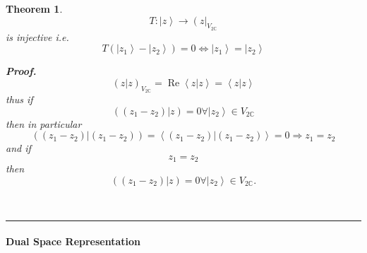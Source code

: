 \documentclass[aps,preprint]{revtex4}%
\newtheorem{theorem}{Theorem}
\newenvironment{proof}[1][Proof]{\noindent\textbf{#1.} }{\ \rule{0.5em}{0.5em}}
\begin{document}
\begin{theorem}%
\begin{equation}
T:\left\vert z\right\rangle \rightarrow\left(  z\right\vert _{V_{2\mathbb{C}}}%
\end{equation}
is injective i.e.
\begin{equation}
T\left(  \left\vert z_{1}\right\rangle -\left\vert z_{2}\right\rangle \right)
=0\Leftrightarrow\left\vert z_{1}\right\rangle =\left\vert z_{2}\right\rangle
\end{equation}


\begin{proof}%
\begin{equation}
\left(  \left.  z\right\vert z\right)  _{V_{2\mathbb{C}}}=\operatorname{Re}%
\left\langle \left.  z\right\vert z\right\rangle =\left\langle \left.
z\right\vert z\right\rangle
\end{equation}
thus if
\begin{equation}
\left(  \left.  \left(  z_{1}-z_{2}\right)  \right\vert z\right)
=0\forall\left\vert z_{2}\right\rangle \in V_{2\mathbb{C}}%
\end{equation}
then in particular
\begin{equation}
\left(  \left.  \left(  z_{1}-z_{2}\right)  \right\vert \left(  z_{1}%
-z_{2}\right)  \right)  =\left\langle \left.  \left(  z_{1}-z_{2}\right)
\right\vert \left(  z_{1}-z_{2}\right)  \right\rangle =0\Rightarrow
z_{1}=z_{2}%
\end{equation}
and if
\begin{equation}
z_{1}=z_{2}%
\end{equation}
then
\begin{equation}
\left(  \left.  \left(  z_{1}-z_{2}\right)  \right\vert z\right)
=0\forall\left\vert z_{2}\right\rangle \in V_{2\mathbb{C}}.
\end{equation}

\end{proof}
\end{theorem}

\paragraph{Dual Space Representation}
\end{document}
